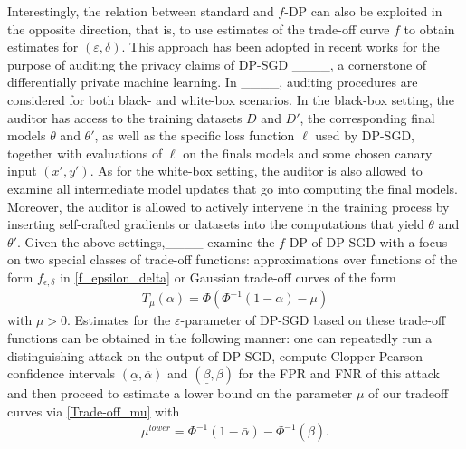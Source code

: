 Interestingly, the relation between standard and $f$-DP can also be exploited in the opposite direction, that is, to use estimates of the trade-off curve $f$ to obtain estimates for $(\varepsilon, \delta)$. This approach has been adopted in recent works for the purpose of auditing the privacy claims of DP-SGD ____, a cornerstone of differentially private machine learning. 
In ____, auditing procedures are considered for both black- and white-box scenarios. In the black-box setting, the auditor has access to the training datasets $D$ and $D'$, the corresponding final models $\theta$ and $\theta'$, as well as the specific loss function $\ell$ used by DP-SGD, together with evaluations of $\ell$ on the finals models and some chosen canary input $(x',y')$. As for the white-box setting, the auditor is also allowed to examine all intermediate model updates that go into computing the final models. Moreover, the auditor is allowed to actively intervene in the training process by inserting self-crafted gradients or datasets into the computations that yield $\theta$ and $\theta'$. Given the above settings,____ examine the $f$-DP of DP-SGD with a focus on two special classes of trade-off functions: approximations over functions of the form $f_{\epsilon,\delta}$ in \eqref{f_epsilon_delta} or Gaussian trade-off curves of the form
\begin{align} \label{Trade-off_mu}
    T_{\mu}(\alpha) = \Phi(\Phi^{-1}(1 - \alpha) - \mu)
\end{align}
with $\mu >0$. Estimates for the $\varepsilon$-parameter of DP-SGD based on these trade-off functions can be obtained in the following manner: one can repeatedly run a distinguishing attack on the output of DP-SGD, compute Clopper-Pearson confidence intervals $(\underline{\alpha},\overline{\alpha})$ and $(\underline{\beta},\overline{\beta})$ for the FPR and FNR of this attack and then proceed to estimate a lower bound on the parameter $\mu$ of our tradeoff curves via \eqref{Trade-off_mu} with
\begin{align*}
    {\mu}^{lower} = \Phi^{-1}(1 - \bar{\alpha}) - \Phi^{-1}( \bar{\beta}).
\end{align*}
